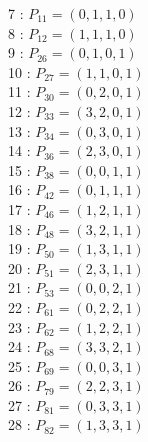\documentclass{article}
\begin{document}
{\begin{multicols}{3}
7 : $P_{11}=( 0, 1, 1, 0 )$\\
8 : $P_{12}=( 1, 1, 1, 0 )$\\
9 : $P_{26}=( 0, 1, 0, 1 )$\\
10 : $P_{27}=( 1, 1, 0, 1 )$\\
11 : $P_{30}=( 0, 2, 0, 1 )$\\
12 : $P_{33}=( 3, 2, 0, 1 )$\\
13 : $P_{34}=( 0, 3, 0, 1 )$\\
14 : $P_{36}=( 2, 3, 0, 1 )$\\
15 : $P_{38}=( 0, 0, 1, 1 )$\\
16 : $P_{42}=( 0, 1, 1, 1 )$\\
17 : $P_{46}=( 1, 2, 1, 1 )$\\
18 : $P_{48}=( 3, 2, 1, 1 )$\\
19 : $P_{50}=( 1, 3, 1, 1 )$\\
20 : $P_{51}=( 2, 3, 1, 1 )$\\
21 : $P_{53}=( 0, 0, 2, 1 )$\\
22 : $P_{61}=( 0, 2, 2, 1 )$\\
23 : $P_{62}=( 1, 2, 2, 1 )$\\
24 : $P_{68}=( 3, 3, 2, 1 )$\\
25 : $P_{69}=( 0, 0, 3, 1 )$\\
26 : $P_{79}=( 2, 2, 3, 1 )$\\
27 : $P_{81}=( 0, 3, 3, 1 )$\\
28 : $P_{82}=( 1, 3, 3, 1 )$\\
\end{multicols}


%


%


}%
\end{document}
